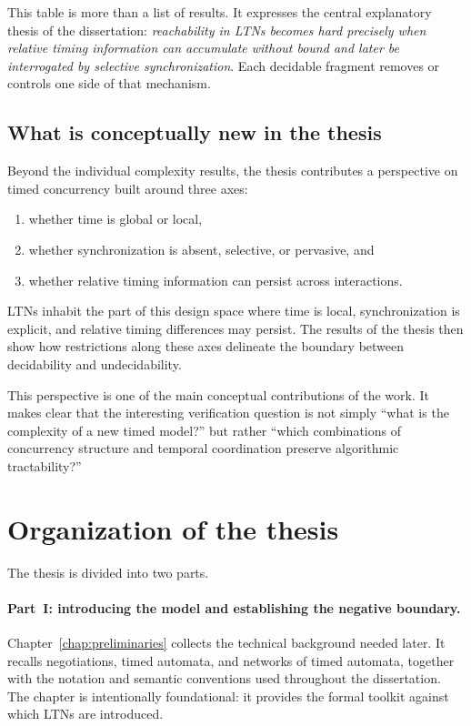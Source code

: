 This table is more than a list of results. It expresses the central explanatory thesis of the dissertation: \emph{reachability in LTNs becomes hard precisely when relative timing information can accumulate without bound and later be interrogated by selective synchronization}. Each decidable fragment removes or controls one side of that mechanism.

\subsection{What is conceptually new in the thesis}

Beyond the individual complexity results, the thesis contributes a perspective on timed concurrency built around three axes:
\begin{enumerate}
    \item whether time is global or local,
    \item whether synchronization is absent, selective, or pervasive, and
    \item whether relative timing information can persist across interactions.
\end{enumerate}
LTNs inhabit the part of this design space where time is local, synchronization is explicit, and relative timing differences may persist. The results of the thesis then show how restrictions along these axes delineate the boundary between decidability and undecidability.

This perspective is one of the main conceptual contributions of the work. It makes clear that the interesting verification question is not simply ``what is the complexity of a new timed model?'' but rather ``which combinations of concurrency structure and temporal coordination preserve algorithmic tractability?''


\section{Organization of the thesis}
\label{sec:intro-organization}

The thesis is divided into two parts.

\paragraph{Part~I: introducing the model and establishing the negative boundary.}
Chapter~\ref{chap:preliminaries} collects the technical background needed later. It recalls negotiations, timed automata, and networks of timed automata, together with the notation and semantic conventions used throughout the dissertation. The chapter is intentionally foundational: it provides the formal toolkit against which LTNs are introduced.

